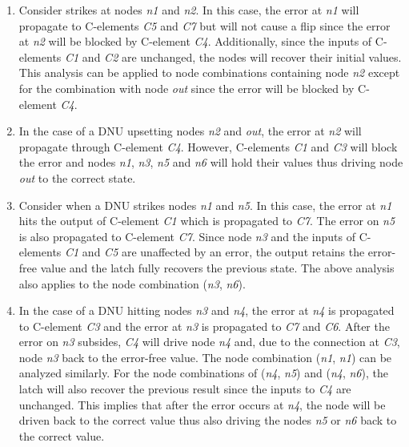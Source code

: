 \begin{enumerate}
	\item Consider strikes at nodes \textit{n1} and \textit{n2}. In this case, the error at \textit{n1} will propagate to C-elements \textit{C5} and \textit{C7} but will not cause a flip since the error at \textit{n2} will be blocked by C-element \textit{C4}. Additionally, since the inputs of C-elements \textit{C1} and \textit{C2} are unchanged, the nodes will recover their initial values. This analysis can be applied to node combinations containing node \textit{n2} except for the combination with node \textit{out} since the error will be blocked by C-element \textit{C4}.
	
	\item In the case of a DNU upsetting nodes \textit{n2} and \textit{out}, the error at \textit{n2} will propagate through C-element \textit{C4}. However, C-elements \textit{C1} and \textit{C3} will block the error and nodes \textit{n1}, \textit{n3}, \textit{n5} and \textit{n6} will hold their values thus driving node \textit{out} to the correct state. 
	
	\item Consider when a DNU strikes nodes \textit{n1} and \textit{n5}. In this case, the error at \textit{n1} hits the output of C-element \textit{C1} which is propagated to \textit{C7}. The error on \textit{n5} is also propagated to C-element \textit{C7}. Since node \textit{n3} and the inputs of C-elements \textit{C1} and \textit{C5} are unaffected by an error, the output retains the error-free value and the latch fully recovers the previous state. The above analysis also applies to the node combination (\textit{n3}, \textit{n6}).
	
	\item In the case of a DNU hitting nodes \textit{n3} and \textit{n4}, the error at \textit{n4} is propagated to C-element \textit{C3} and the error at \textit{n3} is propagated to \textit{C7} and \textit{C6}. After the error on \textit{n3} subsides, \textit{C4} will drive node \textit{n4} and, due to the connection at \textit{C3}, node \textit{n3} back to the error-free value. The node combination (\textit{n1}, \textit{n1}) can be analyzed similarly. For the node combinations of (\textit{n4}, \textit{n5}) and (\textit{n4}, \textit{n6}), the latch will also recover the previous result since the inputs to \textit{C4} are unchanged. This implies that after the error occurs at \textit{n4}, the node will be driven back to the correct value thus also driving the nodes \textit{n5} or \textit{n6} back to the correct value.
	

\end{enumerate}
